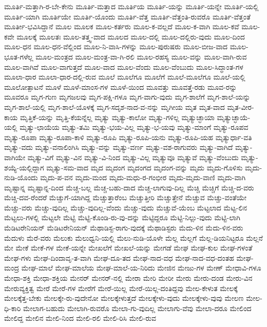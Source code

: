 {ಮೂರ್ತಿ-ಮತ್ತಾಗಿ-ರ-ಬೇ-ಕೇನು
ಮೂರ್ತಿ-ಮತ್ತಾದ
ಮೂರ್ತಿಯ
ಮೂರ್ತಿ-ಯನ್ನು
ಮೂರ್ತಿ-ಯನ್ನೇ
ಮೂರ್ತಿ-ಯಲ್ಲಿ
ಮೂರ್ತಿ-ಯಾಗಿ
ಮೂರ್ತಿಯೇ
ಮೂರ್ತಿ-ಯೊಂದು
ಮೂರ್ತಿ-ವೆತ್ತ
ಮೂರ್ತಿ-ವೆತ್ತಂತಿ-ರುವರೊ
ಮೂರ್ತಿ-ವೆತ್ತಂತೆ
ಮೂರ್ತೀ-ಭವಿಸಿದ್ದಾನೆ
ಮೂಲ
ಮೂಲಕ
ಮೂಲ-ಕರ್ತರು
ಮೂಲ-ಕ-ವಲ್ಲದೆ
ಮೂಲ-ಕ-ವಾಗಿ
ಮೂಲ-ಕವೆ
ಮೂಲ-ಕವೇ
ಮೂಲಕ್ಕೆ
ಮೂಲತಃ
ಮೂಲ-ತತ್ತ್ವ-ವಾದ
ಮೂಲದ
ಮೂಲ-ದಲ್ಲಿ
ಮೂಲ-ದಲ್ಲಿರು-ವುದು
ಮೂಲ-ದಿಂದ
ಮೂಲ-ಧನ
ಮೂಲ-ಧನ-ವೆಲ್ಲಿಂದ
ಮೂಲ-ನಿ-ವಾಸಿ-ಗಳನ್ನು
ಮೂಲ-ಪುರುಷರು
ಮೂಲ-ಬೀಜ-ವಾದ
ಮೂಲ-ಭೂತ-ಗಳೆಲ್ಲ
ಮೂಲ-ಮಂತ್ರದ
ಮೂಲ-ಮಂತ್ರ-ವಾ-ಗಿ-ರಲಿ
ಮೂಲ-ರಹಸ್ಯ
ಮೂಲ-ವನ್ನು
ಮೂಲ-ವಾಗಿ-ರುವ
ಮೂಲ-ವಾಗಿವೆ
ಮೂಲ-ವಾಗುತ್ತದೆ
ಮೂಲ-ವಾದ
ಮೂಲ-ವೆಂದು
ಮೂಲ-ವೆಂಬುದು
ಮೂಲ-ಸಿದ್ಧಾಂತ-ಗಳ
ಮೂಲಾ-ಧಾರ
ಮೂಲಾ-ಧಾರ-ದಲ್ಲಿ-ರುವ
ಮೂಲೆ
ಮೂಲೆಗೂ
ಮೂಲೆಗೆ
ಮೂಲೆ-ಮೂಲೆಗೂ
ಮೂಲೆ-ಯಲ್ಲಿ
ಮೂಲೋತ್ಪಾಟನೆ
ಮೂಳೆ
ಮೂಳೆ-ಮಾಂಸ-ಗಳ
ಮೂಳೆ-ಯಿಂದ
ಮೂವತ್ತು
ಮೂವತ್ತೆ-ರಡು
ಮೂವ-ರನ್ನು
ಮೂವರೂ
ಮೃಗ-ಗುಣ
ಮೃಗಜಲವು
ಮೃಗ-ಪಕ್ಷಿ-ಗಳೂ
ಮೃಗ-ವಾಗು-ವುದು
ಮೃಗ-ಶಾಲೆಗೆ
ಮೃಗ-ಶಾಲೆ-ಯನ್ನು
ಮೃಗ-ಶಾಲೆ-ಯಲ್ಲಿ
ಮೃಗ-ಶಾಲೆ-ಯೊಳಕ್ಕೆ
ಮೃಗ-ಸದೃಶ-ನಾದ-ವ-ನನ್ನು
ಮೃಗೀಯ
ಮೃತ
ಮೃತ-ವಾದ
ಮೃತ-ವೀರ-ಕಾಯ
ಮೃತ್ತಿಕೆ-ಯನ್ನು
ಮೃತ್ತಿ-ಕೆಯನ್ನೆಲ್ಲ
ಮೃತ್ಯು
ಮೃತ್ಯು-ಕಾಲೋ
ಮೃತ್ಯು-ಗಳಿಲ್ಲ
ಮೃತ್ಯುಚ್ಛಾಯಾ
ಮೃತ್ಯುಚ್ಛಾಯೆ-ಯಲ್ಲಿ
ಮೃತ್ಯು-ಛಾಯೆಯ
ಮೃತ್ಯು-ತಮಿ
ಮೃತ್ಯು-ಭಯ-ವಿಲ್ಲ
ಮೃತ್ಯು-ಭ-ಯವು
ಮೃತ್ಯು-ಮಾಂಗೆ
ಮೃತ್ಯು-ರೂಪವ
ಮೃತ್ಯು-ರೂಪಾ
ಮೃತ್ಯು-ರೂಪಾ-ಕಾಳಿ
ಮೃತ್ಯು-ರೂಪಿ
ಮೃತ್ಯು-ರೂಪಿ-ಯನು
ಮೃತ್ಯು-ರೂಪಿ-ಯಹ
ಮೃತ್ಯುರ್ಧಾ-ವತಿ
ಮೃತ್ಯು-ವದು
ಮೃತ್ಯು-ವನಾಲಿಂಗಿಸಿ
ಮೃತ್ಯು-ವನ್ನು
ಮೃತ್ಯು-ವರ್ಣ
ಮೃತ್ಯು-ವಶ-ರಾಗುವರು
ಮೃತ್ಯು-ವಾಗಿದೆ
ಮೃತ್ಯು-ವಾಗಿಯೇ
ಮೃತ್ಯು-ವಿಗೆ
ಮೃತ್ಯು-ವಿನ
ಮೃತ್ಯು-ವಿ-ನಿಂದ
ಮೃತ್ಯು-ವಿಲ್ಲ
ಮೃತ್ಯುವೂ
ಮೃತ್ಯುವೆ
ಮೃತ್ಯು-ವೆಂಬುದು
ಮೃತ್ಯು-ಶಯ್ಯೆ-ಯಲ್ಲಿದ್ದಾಗ
ಮೃತ್ಯು-ಸಮ-ವಾದ
ಮೃದ
ಮೃದಂಗ
ಮೃದಂಗದ
ಮೃದಂಗ-ವನ್ನು
ಮೃದು
ಮೃದು-ಗೊಳಿಸು
ಮೃದು-ನುಡಿ-ಯೊಂದು
ಮೃದು-ಪ-ವನ
ಮೃದು-ಮಂದ
ಮೃದು-ಮಧು-ರ-ಗಂಭೀರ
ಮೃದು-ಮೃದು-ವಾಣಿ
ಮೃದು-ವಾಗಿ
ಮೃಷ್ಟಾನ್ನ
ಮೃಷ್ಟಾನ್ನ-ದಿಂದ
ಮೆಚ್ಚ-ಬಲ್ಲ
ಮೆಚ್ಚ-ಬಹು-ದಾದ
ಮೆಚ್ಚ-ಲಾಗುವು-ದಿಲ್ಲ
ಮೆಚ್ಚಿ
ಮೆಚ್ಚಿಗೆ
ಮೆಚ್ಚಿ-ದ-ವರು
ಮೆಚ್ಚಿ-ದವ-ರೆಂದರೆ
ಮೆಚ್ಚುಗೆ-ಯಾಗಿದ್ದ
ಮೆಚ್ಚುತ್ತಾರೆಂಬ
ಮೆಚ್ಚುತ್ತೀರಿ
ಮೆಚ್ಚುತ್ತೇನೆ
ಮೆಚ್ಚುವ
ಮೆಚ್ಚು-ವಂತೆಯೇ
ಮೆಚ್ಚು-ವರು
ಮೆಚ್ಚು-ವುದಿಲ್ಲ
ಮೆಚ್ಚು-ವುದಿಲ್ಲ-ವೆಂದು
ಮೆಚ್ಚು-ವುದು
ಮೆಚ್ಚುವೆ-ಯೆಂಬ
ಮೆಟ್ಟಲಾದ
ಮೆಟ್ಟ-ಲಿನ
ಮೆಟ್ಟಲು-ಗಳಲ್ಲಿ
ಮೆಟ್ಟಲೇ
ಮೆಟ್ಟಿ
ಮೆಟ್ಟಿ-ಕೊಂಡಿ-ರು-ವು-ದನ್ನು
ಮೆಟ್ಟಿದ್ದರೂ
ಮೆಟ್ಟಿ-ನಿಲ್ಲು-ವುದು
ಮೆಟ್ಟಿ-ಲಾಗಿ
ಮೆಡಿಟರೇನಿಯನ್
ಮೆಡಿಟರೇನಿಯನ್
ಮೆಥಾಡಿಸ್ಟ-ರಾಗು-ವುದಕ್ಕೆ
ಮೆಥಾಡಿಸ್ಟರು
ಮೆದು-ಳಿನ
ಮೆದು-ಳಿನ-ವರು
ಮೆದುಳು
ಮೆರೆ-ವರು
ಮೆಲುಕು
ಮೆಲುಧ್ವನಿ-ಯಲ್ಲಿ
ಮೆಲು-ನುಡಿ-ಯೊಳೇ
ಮೆಲ್ಲ
ಮೆಲ್ಲಗೆ
ಮೆಲ್ಲ-ಡಿಯನಿಟ್ಟರೂ
ಮೆಲ್ಲನೆ
ಮೇ
ಮೇಕೆ
ಮೇಕೆ-ಗಳ
ಮೇಕೆ-ಯನ್ನೇ
ಮೇಖಲೆಗೆ
ಮೇಖಲೆ-ಯನ್ನು
ಮೇಗಡೆ
ಮೇಘ
ಮೇಘ-ಕುಲ
ಮೇಘ-ಗಳಂತೆ
ಮೇಘ-ಗಳು
ಮೇಘ-ದಿಂದಾವೃ-ತ-ವಾಗಿ
ಮೇಘ-ದೂ-ತದ
ಮೇಘ-ನಾದ-ವಧ
ಮೇಘ-ನಾದ-ವಧ-ದಂತಹ
ಮೇಘ-ಮಂದ್ರ
ಮೇಘ-ಮಾಲೆ
ಮೇಘ-ಮಾಲೆಯ
ಮೇಘ-ಮಾಲೆ-ಯ-ನಿರಿದು
ಮೇಜಿನ
ಮೇಜು-ಗಳ
ಮೇಣ್
ಮೇಧಾವಿ-ಗಳೂ
ಮೇಧಾ-ಶಕ್ತಿ
ಮೇಧಾ-ಶಕ್ತಿಯ
ಮೇನರ್
ಮೇನರ್-ನಲ್ಲಿ
ಮೇರಾ
ಮೇರಿ
ಮೇರೀ
ಮೇರು
ಮೇರು-ದಂಡ
ಮೇರು-ವಿನ
ಮೇರುವ್ಯಕ್ತಿತ್ವ
ಮೇರೆ
ಮೇರೆ-ಗಳ
ಮೇರೆಗೆ
ಮೇರೆ-ಯಿಲ್ಲ
ಮೇರೆ-ಯಿಲ್ಲ-ದಂತಿದ್ದವು
ಮೇಲ-ಕೇಳುತ
ಮೇಲಕ್ಕೆ
ಮೇಲಕ್ಕೆತ್ತ-ಬೇಕು
ಮೇಲಕ್ಕೇ-ರು-ವುದೇನೋ
ಮೇಲಕ್ಕೇಳುತ್ತದೆ
ಮೇಲಕ್ಕೇಳು-ವುದು
ಮೇಲಕ್ಕೇಳು-ವುವು
ಮೇಲಣ
ಮೇಲ-ಧಿ-ಕಾರಿ
ಮೇಲಾಗ-ಬಹುದು
ಮೇಲಾಗಿ-ರುವರೊ
ಮೇಲಾ-ಗು-ವುದಿಲ್ಲ
ಮೇಲಾಗು-ವೆವು
ಮೇಲಾ-ದರೂ
ಮೇಲಿಂದ
ಮೇಲಿದ್ದ
ಮೇಲಿನ
ಮೇಲಿ-ನಿಂದ
ಮೇಲಿ-ರಲಿ
ಮೇಲಿ-ರಿಸಿ
ಮೇಲಿ-ರುವ
}
